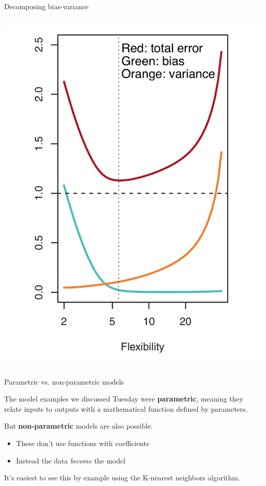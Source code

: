 \documentclass[aspectratio=169]{beamer}
\begin{document}
\begin{frame}{Decomposing bias-variance}
\begin{columns}
\pause 
\includegraphics[scale=0.21]{figures/islr2_12a_text.pdf}

\end{columns}

\end{frame}

\begin{frame}{Parametric vs. non-parametric models}

The model examples we discussed Tuesday were \textbf{parametric}, meaning they relate inputs to outputs with a mathematical function defined by parameters.  

\vspace{5mm}

But \textbf{non-parametric} models are also possible.  
\begin{itemize}
\item These don't use functions with coefficients
\item Instead the data \textit{become} the model
\end{itemize}

\vspace{5mm}

It's easiest to see this by example using the K-nearest neighbors algorithm.

\end{frame}
\end{document}
